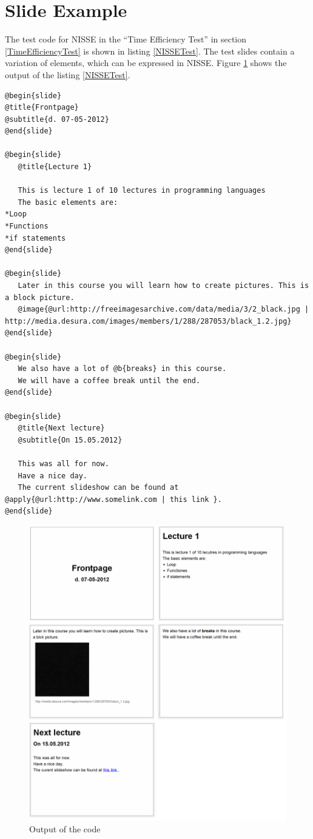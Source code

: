\section{Slide Example}
\label{ASlideExample}
The test code for NISSE in the ``Time Efficiency Test'' in section \ref{TimeEfficiencyTest} is shown in listing \ref{NISSETest}.
The test slides contain a variation of elements, which can be expressed in NISSE.
Figure \ref{fig:EfficiencyTest} shows the output of the listing \ref{NISSETest}.

\begin{lstlisting}[frame=single,caption=Time efficiency test code for NISSE, label=NISSETest]
@begin{slide}
@title{Frontpage}
@subtitle{d. 07-05-2012}
@end{slide}

@begin{slide}
   @title{Lecture 1}
  
   This is lecture 1 of 10 lectures in programming languages
   The basic elements are:
*Loop
*Functions
*if statements
@end{slide}

@begin{slide}
   Later in this course you will learn how to create pictures. This is a block picture.
   @image{@url:http://freeimagesarchive.com/data/media/3/2_black.jpg | http://media.desura.com/images/members/1/288/287053/black_1.2.jpg}
@end{slide}

@begin{slide}
   We also have a lot of @b{breaks} in this course.
   We will have a coffee break until the end.
@end{slide}

@begin{slide}
   @title{Next lecture}
   @subtitle{On 15.05.2012}
  
   This was all for now.
   Have a nice day.
   The current slideshow can be found at @apply{@url:http://www.somelink.com | this link }.
@end{slide}

\end{lstlisting}


\begin{figure}[htbp]
	\centering
		\includegraphics[width=1.00\textwidth]{./images/EfficiencyTest.png}
	\caption{Output of the code}
	\label{fig:EfficiencyTest}
\end{figure}